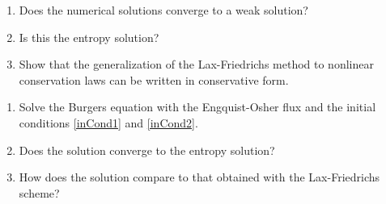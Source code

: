 \documentclass{article}
\begin{document}
\begin{exerciseList}
\begin{enumerate}
\item
Does the numerical solutions converge to a weak solution?

\item
Is this the entropy solution?

\item
Show that the generalization of the Lax-Friedrichs method to nonlinear conservation laws can be written in conservative form.
\end{enumerate}

\item
\begin{enumerate}
\item
Solve the Burgers equation with the Engquist-Osher flux and the initial conditions \eqref{inCond1} and \eqref{inCond2}.

\item
Does the solution converge to the entropy solution?

\item
How does the solution compare to that obtained with the Lax-Friedrichs scheme?

\end{enumerate}



\end{exerciseList}
\end{document}
